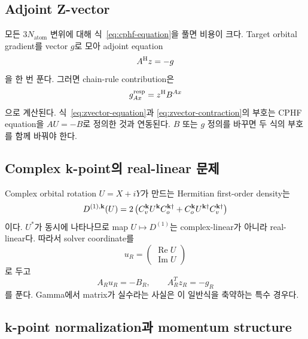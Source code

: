 \subsection{Adjoint Z-vector}

모든 $3N_{\mathrm{atom}}$ 변위에 대해 식~\eqref{eq:cphf-equation}을 풀면 비용이 크다.
Target orbital gradient를 vector $g$로 모아 adjoint equation
\begin{equation}
  A^{\mathrm{H}}z=-g
  \label{eq:zvector-equation}
\end{equation}
을 한 번 푼다. 그러면 chain-rule contribution은
\begin{equation}
  g_{Ax}^{\mathrm{resp}}
  =z^{\mathrm{H}}B^{Ax}
  \label{eq:zvector-contraction}
\end{equation}
으로 계산된다. 식~\eqref{eq:zvector-equation}과
\eqref{eq:zvector-contraction}의 부호는 CPHF equation을 $AU=-B$로 정의한 것과
연동된다. $B$ 또는 $g$ 정의를 바꾸면 두 식의 부호를 함께 바꿔야 한다.

\subsection{Complex k-point의 real-linear 문제}

Complex orbital rotation $U=X+iY$가 만드는 Hermitian first-order density는
\begin{equation}
  D^{(1),\mathbf{k}}(U)
  =2\left(C_v^{\mathbf{k}}U^{\mathbf{k}}C_o^{\mathbf{k}\dagger}
          +C_o^{\mathbf{k}}U^{\mathbf{k}\dagger}C_v^{\mathbf{k}\dagger}\right)
  \label{eq:first-order-density}
\end{equation}
이다. $U^*$가 동시에 나타나므로 map $U\mapsto D^{(1)}$는 complex-linear가 아니라
real-linear다. 따라서 solver coordinate를
\begin{equation}
  u_R=\begin{pmatrix}\operatorname{Re}U\\\operatorname{Im}U\end{pmatrix}
  \label{eq:realified-coordinate}
\end{equation}
로 두고
\begin{equation}
  A_Ru_R=-B_R,
  \qquad A_R^Tz_R=-g_R
  \label{eq:realified-zvector}
\end{equation}
를 푼다. Gamma에서 matrix가 실수라는 사실은 이 일반식을 축약하는 특수 경우다.

\subsection{k-point normalization과 momentum structure}

